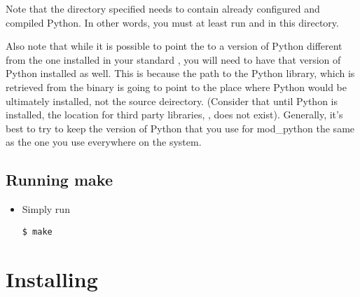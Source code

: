 \begin{itemize}
Note that the directory specified needs to contain already configured and
compiled Python. In other words, you must at least run  and
 in this directory.

Also note that while it is possible to point the
 to a version of Python different from the
one installed in your standard , you will need to have
that version of Python installed as well.  This is because the path to
the Python library, which is retrieved from the  binary
is going to point to the place where Python would be ultimately
installed, not the source deirectory. (Consider that until Python is
installed, the location for third party libraries,
, does not exist). Generally, it's best to try
to keep the version of Python that you use for mod_python the same as
the one you use everywhere on the system.

\end{itemize}

\subsection{Running make\label{inst-make}}

\begin{itemize}

\item
Simply run
\begin{verbatim}
$ make
\end{verbatim}



\end{itemize}

\section{Installing\label{inst-installing}}

